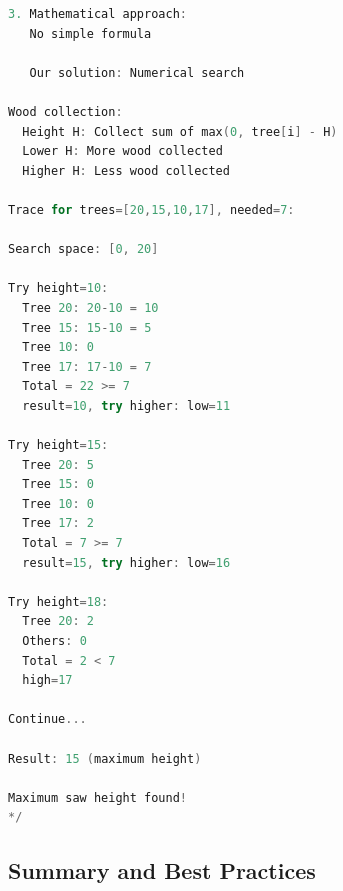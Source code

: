 \documentclass[11pt,a4paper,oneside]{book}
\begin{document}
\begin{lstlisting}[language=C++, caption=Complete Predicate Function Solutions]
3. Mathematical approach:
   No simple formula
   
   Our solution: Numerical search

Wood collection:
  Height H: Collect sum of max(0, tree[i] - H)
  Lower H: More wood collected
  Higher H: Less wood collected

Trace for trees=[20,15,10,17], needed=7:

Search space: [0, 20]

Try height=10:
  Tree 20: 20-10 = 10
  Tree 15: 15-10 = 5
  Tree 10: 0
  Tree 17: 17-10 = 7
  Total = 22 >= 7 
  result=10, try higher: low=11

Try height=15:
  Tree 20: 5
  Tree 15: 0
  Tree 10: 0
  Tree 17: 2
  Total = 7 >= 7 
  result=15, try higher: low=16

Try height=18:
  Tree 20: 2
  Others: 0
  Total = 2 < 7 
  high=17

Continue...

Result: 15 (maximum height)

Maximum saw height found!
*/
\end{lstlisting}
\subsection{Summary and Best Practices}
\end{document}
